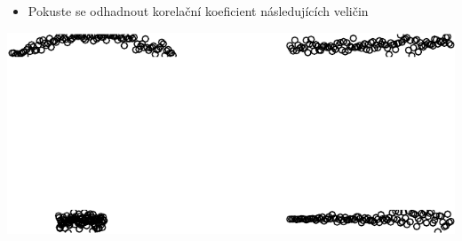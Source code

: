 \documentclass[
  letterpaper,
  DIV=11,
  numbers=noendperiod]{scrreprt}
\providecommand{\tightlist}{%
  \setlength{\itemsep}{0pt}\setlength{\parskip}{0pt}}\usepackage{longtable,booktabs,array}
\begin{document}
\begin{itemize}
\tightlist
\item
  Pokuste se odhadnout korelační koeficient následujících veličin
\end{itemize}

\includegraphics{12_extremalni_rozdeleni_files/figure-pdf/unnamed-chunk-3-1.pdf}
\end{document}

